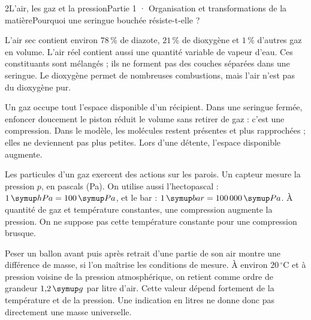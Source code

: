 \begin{ouverture}[college1]{2}{L’air, les gaz et la pression}{Partie 1 · Organisation et transformations de la matière}{Pourquoi une seringue bouchée résiste-t-elle ?}
\end{ouverture}
\label{ess-2}
L’air sec contient environ $78\,\%$ de diazote, $21\,\%$ de dioxygène et $1\,\%$ d’autres gaz en volume. L’air réel contient aussi une quantité variable de vapeur d’eau. Ces constituants sont mélangés ; ils ne forment pas des couches séparées dans une seringue. Le dioxygène permet de nombreuses combustions, mais l’air n’est pas du dioxygène pur.\par
{}
Un gaz occupe tout l’espace disponible d’un récipient. Dans une seringue fermée, enfoncer doucement le piston réduit le volume sans retirer de gaz : c’est une compression. Dans le modèle, les molécules restent présentes et plus rapprochées ; elles ne deviennent pas plus petites. Lors d’une détente, l’espace disponible augmente.\par
\clearpage
{}
Les particules d’un gaz exercent des actions sur les parois. Un capteur mesure la pression $p$, en pascals (Pa). On utilise aussi l’hectopascal : $1\unite{hPa}=100\unite{Pa}$, et le bar : $1\unite{bar}=100\,000\unite{Pa}$. À quantité de gaz et température constantes, une compression augmente la pression. On ne suppose pas cette température constante pour une compression brusque.\par
{}
Peser un ballon avant puis après retrait d’une partie de son air montre une différence de masse, si l’on maîtrise les conditions de mesure. À environ $20\,^{\circ}\mathrm C$ et à pression voisine de la pression atmosphérique, on retient comme ordre de grandeur $1{,}2\unite g$ par litre d’air. Cette valeur dépend fortement de la température et de la pression. Une indication en litres ne donne donc pas directement une masse universelle.\par
